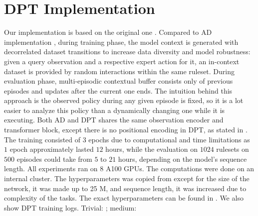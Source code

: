 \documentclass{article}
\begin{document}
\section{DPT Implementation}
\label{apndx:dpt}
Our implementation is based on the original one \citep{lee2023supervised}. Compared to AD implementation \citep{laskin2022context}, during training phase, the model context is generated with decorrelated dataset transitions to increase data diversity and model robustness: given a query observation and a respective expert action for it, an in-context dataset is provided by random interactions within the same ruleset. During evaluation phase, multi-episodic contextual buffer consists only of previous episodes and updates after the current one ends. The intuition behind this approach is the observed policy during any given episode is fixed, so it is a lot easier to analyze this policy than a dynamically changing one while it is executing.
Both AD and DPT shares the same observation encoder and transformer block, except there is no positional encoding in DPT, as stated in \citep{lee2023supervised}.
The training consisted of $3$ epochs due to computational and time limitations as $1$ epoch approximately lasted $12$ hours, while the evaluation on $1024$ rulesets on $500$ episodes could take from $5$ to $21$ hours, depending on the model's sequence length. All experiments ran on $8$ A100 GPUs. The computations were done on an internal cluster.
The hyperparameters was copied from \citep{lee2023supervised} except for the size of the network, it was made up to 25 M, and sequence length, it was increased due to complexity of the tasks. The exact hyperparameters can be found in .
We also show DPT training logs. Trivial: \href{https://wandb.ai/dunnolab/xminigrid-datasets?nw=smrpeqzlu6a}{\color{blue}{wandb}}; medium: \href{https://wandb.ai/dunnolab/xminigrid-datasets?nw=pfg0umx9c5d}{\color{blue}{wandb}}
\end{document}
